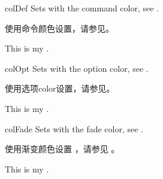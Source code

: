 \begin{docCommand}{colDef}{}
Sets  with the command color, see .

使用命令颜色设置，请参见。
\begin{dispExample}
This is my .
\end{dispExample}
\end{docCommand}

\begin{docCommand}{colOpt}{}
Sets  with the option color, see .

使用选项color设置，请参见。
\begin{dispExample}
This is my .
\end{dispExample}
\end{docCommand}


\begin{docCommand}[doc new=2019-09-18]{colFade}{}
Sets  with the fade color, see .

使用渐变颜色设置 ，请参见 。
\begin{dispExample}
This is my .
\end{dispExample}
\end{docCommand}